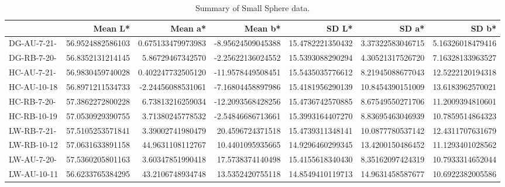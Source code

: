\begin{table}[htbp]
\begin{tabular}{l|n{5}{2}|n{5}{2}|n{5}{2}|n{5}{2}|n{5}{2}|n{5}{2}} %
 & {Mean L*} & {Mean a*} & {Mean b*} & {SD L*} & {SD a*} & {SD b*} \\\hline
DG-AU-7-21- & 56.9524882586103 & 0.675133479973983 & -8.95624509045388 & 15.4782221350432 & 3.37322583046715 & 5.16326018479416 \\
DG-RB-7-20- & 56.8352131214145 & 5.86729467342570 & -2.25622136024552 & 15.5393088290294 & 4.30521317526720 & 7.16328133963527 \\
HC-AU-7-21- & 56.9830459740028 & 0.402247732505120 & -11.9578449508451 & 15.5435035776612 & 8.21945088677043 & 12.5222120194318 \\
HC-AU-10-18 & 56.8971211534733 & -2.24456088531061 & -7.16804458897986 & 15.4181956290139 & 10.8454390151009 & 13.6183962570021 \\
HC-RB-7-20- & 57.3862272800228 & 6.73813216259034 & -12.2093568428256 & 15.4736742570885 & 8.67549550271706 & 11.2009394810601 \\
HC-RB-10-19 & 57.0530929390755 & 3.71380245778532 & -2.54846686713661 & 15.3993164407270 & 8.83695463046939 & 10.7859514864323 \\
LW-RB-7-21- & 57.5105253571841 & 3.39002741980479 & 20.4596724371518 & 15.4739311348141 & 10.0877780537142 & 12.4311707631679 \\
LW-RB-10-12 & 57.0631633891158 & 44.9631108112767 & 10.4401095935665 & 14.9296460299345 & 13.4200150486452 & 11.1293401028562 \\
LW-AU-7-20- & 57.5360205801163 & 3.60347851990418 & 17.5738374140498 & 15.4155618340430 & 8.35162097424319 & 10.7933314652044 \\
LW-AU-10-11 & 56.6233765384295 & 43.2106748934748 & 13.5352420755118 & 14.8549410119713 & 14.9631458587677 & 10.6922382005586
\end{tabular}
\caption {Summary of Small Sphere data.}
\label{tab:SS}
\end{table}
\npnoround

